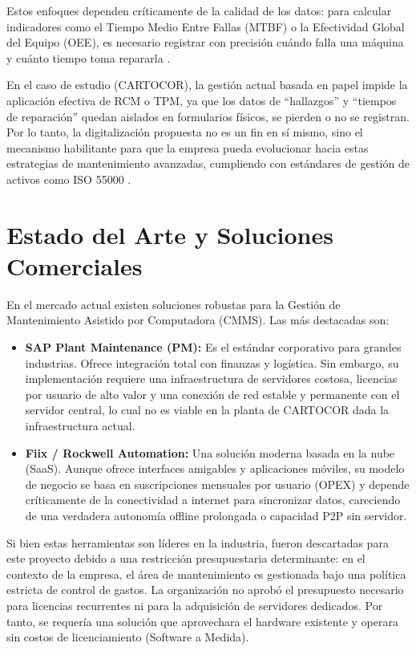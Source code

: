 \documentclass[10pt,a4paper]{report}
\begin{document}
Estos enfoques dependen críticamente de la calidad de los datos: para calcular indicadores como el Tiempo Medio Entre Fallas (MTBF) o la Efectividad Global del Equipo (OEE), es necesario registrar con precisión cuándo falla una máquina y cuánto tiempo toma repararla \cite{ISO14224:2016}.

En el caso de estudio (CARTOCOR), la gestión actual basada en papel impide la aplicación efectiva de RCM o TPM, ya que los datos de ``hallazgos'' y ``tiempos de reparación'' quedan aislados en formularios físicos, se pierden o no se registran. Por lo tanto, la digitalización propuesta no es un fin en sí mismo, sino el mecanismo habilitante para que la empresa pueda evolucionar hacia estas estrategias de mantenimiento avanzadas, cumpliendo con estándares de gestión de activos como ISO 55000 \cite{ISO55000:2014}.

\section*{Estado del Arte y Soluciones Comerciales}
En el mercado actual existen soluciones robustas para la Gestión de Mantenimiento Asistido por Computadora (CMMS). Las más destacadas son:

\begin{itemize}
    \item \textbf{SAP Plant Maintenance (PM):} Es el estándar corporativo para grandes industrias. Ofrece integración total con finanzas y logística. Sin embargo, su implementación requiere una infraestructura de servidores costosa, licencias por usuario de alto valor y una conexión de red estable y permanente con el servidor central, lo cual no es viable en la planta de CARTOCOR dada la infraestructura actual.
    \item \textbf{Fiix / Rockwell Automation:} Una solución moderna basada en la nube (SaaS). Aunque ofrece interfaces amigables y aplicaciones móviles, su modelo de negocio se basa en suscripciones mensuales por usuario (OPEX) y depende críticamente de la conectividad a internet para sincronizar datos, careciendo de una verdadera autonomía offline prolongada o capacidad P2P sin servidor.
\end{itemize}

Si bien estas herramientas son líderes en la industria, fueron descartadas para este proyecto debido a una restricción presupuestaria determinante: en el contexto de la empresa, el área de mantenimiento es gestionada bajo una política estricta de control de gastos. La organización no aprobó el presupuesto necesario para licencias recurrentes ni para la adquisición de servidores dedicados. Por tanto, se requería una solución que aprovechara el hardware existente y operara sin costos de licenciamiento (Software a Medida).
\end{document}
